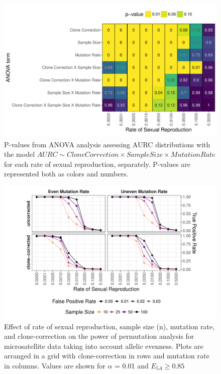\documentclass[]{article}
\theoremstyle{definition}
\theoremstyle{definition}
\theoremstyle{remark}
\begin{document}
\begin{figure}
\centering
\includegraphics[width=1.00000\textwidth]{figure/AURC_ANOVA.pdf}
\caption{P-values from ANOVA analysis assessing AURC distributions with
the model
\(AURC \sim Clone Correction \times Sample Size \times Mutation Rate\)
for each rate of sexual reproduction, separately. P-values are
represented both as colors and numbers.}\label{fig:sim3}
\end{figure}

\begin{figure}
\centering
\includegraphics[width=1.00000\textwidth]{figure/ssr_power_ea.pdf}
\caption{Effect of rate of sexual reproduction, sample size (n),
mutation rate, and clone-correction on the power of permutation analysis
for microsatellite data taking into account allelic evenness. Plots are
arranged in a grid with clone-correction in rows and mutation rate in
columns. Values are shown for \(\alpha\) = 0.01 and
\(E_{5A} \geq 0.85\)}\label{fig:sim4a}
\end{figure}
\end{document}
